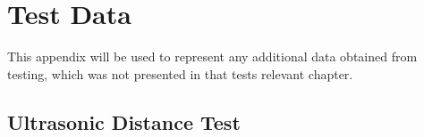 \chapter{Test Data}
This appendix will be used to represent any additional data obtained from
testing, which was not presented in that tests relevant chapter.

\section{Ultrasonic Distance Test}\label{UltraDistTestData}

